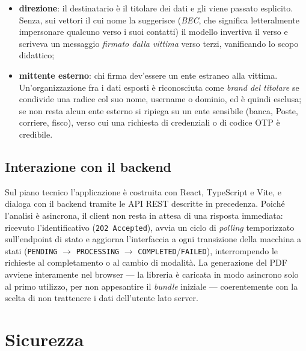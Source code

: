 \documentclass[11pt,a4paper]{article}
\begin{document}
\begin{itemize}[nosep]
\begin{itemize}[nosep]
                è il sito dell'attaccante;
          \item \textbf{direzione}: il destinatario è il titolare dei dati e gli viene
                passato esplicito. Senza, sui vettori il cui nome la suggerisce
                (\emph{BEC}, che significa letteralmente impersonare qualcuno verso i suoi
                contatti) il modello invertiva il verso e scriveva un messaggio
                \emph{firmato dalla vittima} verso terzi, vanificando lo scopo didattico;
          \item \textbf{mittente esterno}: chi firma dev'essere un ente estraneo alla
                vittima. Un'organizzazione fra i dati esposti è riconosciuta come
                \emph{brand del titolare} se condivide una radice col suo nome, username o
                dominio, ed è quindi esclusa; se non resta alcun ente esterno si ripiega su
                un ente sensibile (banca, Poste, corriere, fisco), verso cui una richiesta
                di credenziali o di codice OTP è credibile.
        \end{itemize}
\end{itemize}

\subsection{Interazione con il backend}
 Sul piano tecnico l'applicazione è costruita con
React, TypeScript e Vite, e dialoga con il backend tramite le API REST descritte in
precedenza. Poiché l'analisi è asincrona, il client non resta in attesa di una risposta
immediata: ricevuto l'identificativo (\texttt{202 Accepted}), avvia un ciclo di
\emph{polling} temporizzato sull'endpoint di stato e aggiorna l'interfaccia a ogni
transizione della macchina a stati (\texttt{PENDING} $\rightarrow$ \texttt{PROCESSING}
$\rightarrow$ \texttt{COMPLETED}/\texttt{FAILED}), interrompendo le richieste al
completamento o al cambio di modalità. La generazione del PDF avviene interamente nel
browser --- la libreria è caricata in modo asincrono solo al primo utilizzo, per non
appesantire il \emph{bundle} iniziale --- coerentemente con la scelta di non trattenere i
dati dell'utente lato server.

\section{Sicurezza}
\label{sec:sec}
\end{document}
